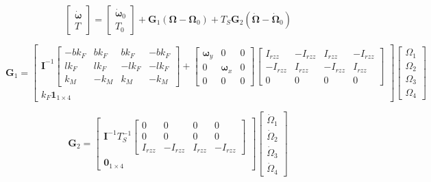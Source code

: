 \documentclass[11pt, a4paper, twoside]{report}
\begin{document}
\begin{equation}
	\begin{bmatrix}
		\bm{\dot{\omega}}\\
		T
	\end{bmatrix} = 
	\begin{bmatrix}
		\bm{\dot{\omega}}_0\\
		T_0
	\end{bmatrix} + \bm{G}_1(\bm{\Omega} - \bm{\Omega}_0) + T_S \bm{G}_2(\bm{\dot{\Omega}} - \bm{\dot{\Omega}}_0)
	\label{eq:TODO}
\end{equation}

\begin{equation}
	\bm{G}_1 = 
	\begin{bmatrix}
		\bm{I}^{-1}\begin{bmatrix}
			-bk_F & bk_F & bk_F & -bk_F \\
			lk_F & lk_F & -lk_F & -lk_F \\
			k_M & -k_M & k_M & -k_M 
		\end{bmatrix} + 	
		\begin{bmatrix}
			\bm{\omega}_y & 0 & 0 \\
			0 & \bm{\omega}_x & 0 \\
			0 & 0 & 0 
		\end{bmatrix}	
		\begin{bmatrix}
			I_{rzz} & -I_{rzz} & I_{rzz} & -I_{rzz} \\
			-I_{rzz} & I_{rzz} & -I_{rzz} & I_{rzz} \\
			0 & 0 & 0 & 0 
		\end{bmatrix}\\
			k_F \bm{1}_{1\times4}
	\end{bmatrix}
	\begin{bmatrix}
		\Omega_1\\
		\Omega_2\\
		\Omega_3\\
		\Omega_4
	\end{bmatrix}
	\label{eq:TODO}
\end{equation}

\begin{equation}
	\bm{G}_2 = 
	\begin{bmatrix}
		\bm{I}^{-1} T_S^{-1}\begin{bmatrix}
			0 & 0 & 0 & 0 \\
			0 & 0 & 0 & 0 \\
			I_{rzz} & -I_{rzz} & I_{rzz} & -I_{rzz}
		\end{bmatrix} \\
		\bm{0}_{1\times4}
	\end{bmatrix}
	\begin{bmatrix}
		\dot{\Omega}_1\\
		\dot{\Omega}_2\\
		\dot{\Omega}_3\\
		\dot{\Omega}_4
	\end{bmatrix}
	\label{eq:TODO}
\end{equation}
\end{document}

